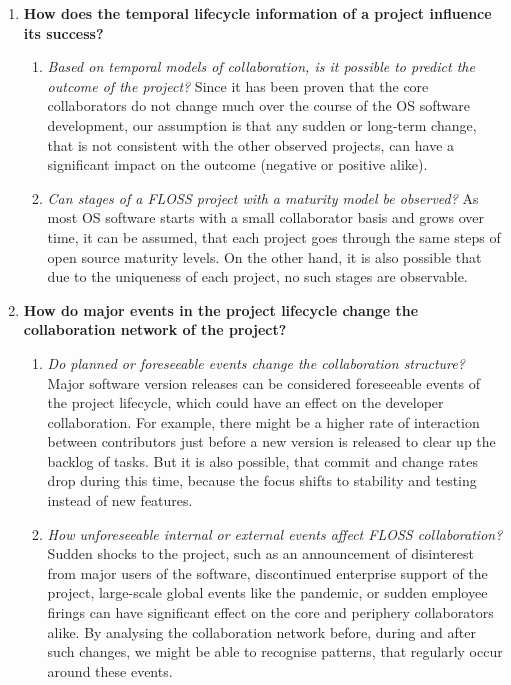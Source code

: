 \begin{enumerate}
    \item \textbf{How does the temporal lifecycle information of a project influence its success?}
    
    \begin{enumerate}
        \item \textit{Based on temporal models of collaboration, is it possible to predict the outcome of the project?} Since it has been proven that the core collaborators do not change much over the course of the OS software development, our assumption is that any sudden or long-term change, that is not consistent with the other observed projects, can have a significant impact on the outcome (negative or positive alike).
        \item \textit{Can stages of a FLOSS project with a maturity model be observed?} As most OS software starts with a small collaborator basis and grows over time, it can be assumed, that each project goes through the same steps of open source maturity levels. On the other hand, it is also possible that due to the uniqueness of each project, no such stages are observable. 
    \end{enumerate}

    \item \textbf{How do major events in the project lifecycle change the collaboration network of the project?}
    \begin{enumerate}
        \item \textit{Do planned or foreseeable events change the collaboration structure?} Major software version releases can be considered foreseeable events of the project lifecycle, which could have an effect on the developer collaboration. For example, there might be a higher rate of interaction between contributors just before a new version is released to clear up the backlog of tasks. But it is also possible, that commit and change rates drop during this time, because the focus shifts to stability and testing instead of new features.
        \item \textit{How unforeseeable internal or external events affect FLOSS collaboration?} Sudden shocks to the project, such as an announcement of disinterest from major users of the software, discontinued enterprise support of the project, large-scale global events like the pandemic, or sudden employee firings can have significant effect on the core and periphery collaborators alike. By analysing the collaboration network before, during and after such changes, we might be able to recognise patterns, that regularly occur around these events.
    \end{enumerate}
\end{enumerate}

